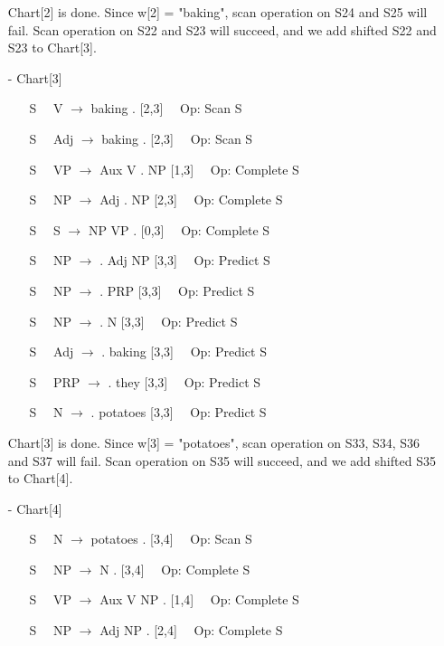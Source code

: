 \documentclass[twoside]{homework}
\begin{document}
\begin{itemize}
\begin{itemize}
    \end{itemize}
    Chart[2] is done. Since w[2] = "baking", scan operation on S24 and S25 will fail. Scan operation on S22 and S23 will succeed, and we add shifted S22 and S23 to Chart[3].
    \item [-] Chart[3]
    \begin{itemize}
        \item [S] $\text{ }$ V $\xrightarrow{}$ baking . [2,3] $\text{ }$ Op: Scan S
        \item [S] $\text{ }$ Adj $\xrightarrow{}$ baking . [2,3] $\text{ }$ Op: Scan S
        \item [S] $\text{ }$ VP $\xrightarrow{}$ Aux V . NP [1,3] $\text{ }$ Op: Complete S
        \item [S] $\text{ }$ NP $\xrightarrow{}$ Adj . NP [2,3] $\text{ }$ Op: Complete S
        \item [S] $\text{ }$ S $\xrightarrow{}$ NP VP . [0,3] $\text{ }$ Op: Complete S
        \item [S] $\text{ }$ NP $\xrightarrow{}$ . Adj NP [3,3] $\text{ }$ Op: Predict S
        \item [S] $\text{ }$ NP $\xrightarrow{}$ . PRP [3,3] $\text{ }$ Op: Predict S
        \item [S] $\text{ }$ NP $\xrightarrow{}$ . N [3,3] $\text{ }$ Op: Predict S
        \item [S] $\text{ }$ Adj $\xrightarrow{}$ . baking [3,3] $\text{ }$ Op: Predict S
        \item [S] $\text{ }$ PRP $\xrightarrow{}$ . they [3,3] $\text{ }$ Op: Predict S
        \item [S] $\text{ }$ N $\xrightarrow{}$ . potatoes [3,3] $\text{ }$ Op: Predict S
    \end{itemize}
    Chart[3] is done. Since w[3] = "potatoes", scan operation on S33, S34, S36 and S37 will fail. Scan operation on S35 will succeed, and we add shifted S35 to Chart[4].
    \item [-] Chart[4]
    \begin{itemize}
        \item [S] $\text{ }$ N $\xrightarrow{}$ potatoes . [3,4] $\text{ }$ Op: Scan S
        \item [S] $\text{ }$ NP $\xrightarrow{}$ N . [3,4] $\text{ }$ Op: Complete S
        \item [S] $\text{ }$ VP $\xrightarrow{}$ Aux V NP . [1,4] $\text{ }$ Op: Complete S
        \item [S] $\text{ }$ NP $\xrightarrow{}$ Adj NP . [2,4] $\text{ }$ Op: Complete S

\end{itemize}
\end{itemize}
\end{document}
